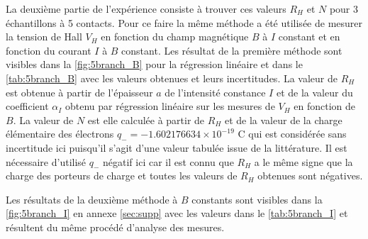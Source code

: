 La deuxième partie de l'expérience consiste à trouver ces valeurs \(R_H\) et \(N\) pour 3 échantillons à 5 contacts. Pour ce faire la même méthode a été utilisée de mesurer la tension de Hall \(V_H\) en fonction du champ magnétique \(B\) à \(I\) constant et en fonction du courant \(I\) à \(B\) constant. Les résultat de la première méthode sont visibles dans la \autoref{fig:5branch_B} pour la régression linéaire et dans le \autoref{tab:5branch_B} avec les valeurs obtenues et leurs incertitudes. La valeur de \(R_H\) est obtenue à partir de l'épaisseur \(a\) de l'intensité constance \(I\) et de la valeur du coefficient \(\alpha_I\) obtenu par régression linéaire sur les mesures de \(V_H\) en fonction de \(B\). La valeur de \(N\) est elle calculée à partir de \(R_H\) et de la valeur de la charge élémentaire des électrons \(q_- = -1.602176634\times10^{-19}\) \si{\coulomb} qui est considérée sans incertitude ici puisqu'il s'agit d'une valeur tabulée issue de la littérature. Il est nécessaire d'utilisé \(q_-\) négatif ici car il est connu que \(R_H\) a le même signe que la charge des porteurs de charge et toutes les valeurs de \(R_H\) obtenues sont négatives.

Les résultats de la deuxième méthode à \(B\) constants sont visibles dans la \autoref{fig:5branch_I} en annexe \autoref{sec:supp} avec les valeurs dans le \autoref{tab:5branch_I} et résultent du même procédé d'analyse des mesures.


